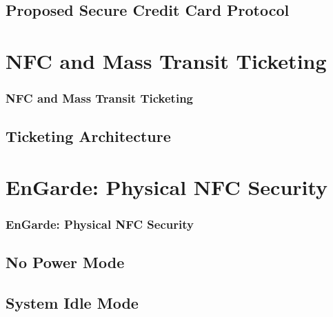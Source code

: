 \documentclass[unknownkeysallowed]{beamer}
\begin{document}
\subsection{Proposed Secure Credit Card Protocol}

\section{NFC and Mass Transit Ticketing}
\begin{frame}
\frametitle{NFC and Mass Transit Ticketing}
\begin{center}\begin{minipage}{.9\textwidth}
\tableofcontents[currentsubsection, hideothersubsections, sectionstyle=show/shaded]
\end{minipage}\end{center}
\end{frame}
%

\subsection{Ticketing Architecture}


\section{EnGarde: Physical NFC Security}
\begin{frame}
\frametitle{EnGarde: Physical NFC Security}
\begin{center}\begin{minipage}{.9\textwidth}
\tableofcontents[currentsubsection, hideothersubsections, sectionstyle=show/shaded]
\end{minipage}\end{center}
\end{frame}
%

\subsection{No Power Mode}
\subsection{System Idle Mode}
\end{document}
